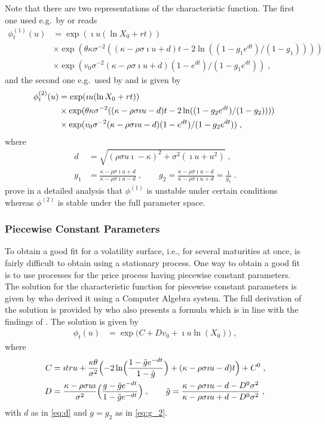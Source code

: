 \documentclass[10pt,a4paper]{article}
\numberwithin{equation}{section} %
\theoremstyle{plain}
\theoremstyle{definition}
\theoremstyle{remark}
\begin{document}
Note that there are two representations of the characteristic function. The first one used e.g.\ by \cite{He93} or \cite{KJ05} reads
\begin{align*}
\phi_t^{(1)}(u)&= \exp (\imath u(\ln X_0 + rt))\;  \\ 
&\times \exp (\theta\kappa\sigma^{-2}((\kappa-\rho\sigma \imath u+d)t-2 \ln((1-g_1e^{dt})/(1-g_1))))\;  \\ 
&\times \exp (v_0\sigma^{-2}(\kappa-\rho\sigma\imath u+d)(1-e^{dt})/(1-g_1e^{dt}))\;,  
\end{align*}
and the second one e.g.\ used by \cite {SST04} and \cite{Ga06} is given by
\begin{align}
\phi_t^{(2)}(u)&= \exp (\imath u(\ln X_0 + rt))\; \label{eq:cf} \\
&\times \exp (\theta\kappa\sigma^{-2}((\kappa-\rho\sigma \imath u-d)t-2 \ln((1-g_2e^{dt})/(1-g_2))))\; \notag \\
&\times \exp (v_0\sigma^{-2}(\kappa-\rho\sigma\imath u-d)(1-e^{dt})/(1-g_2e^{dt}))\;, \notag
\end{align}
where
\begin{align}
d&=\sqrt{(\rho\sigma u\imath-\kappa)^{2}+\sigma^{2}(\imath u+u^2)}\;,\label{eq:d}\\
g_1&=\frac{\kappa-\rho\sigma\imath u+d}{\kappa-\rho\sigma\imath u-d}\;,  \qquad
g_2=\frac{\kappa-\rho\sigma\imath u-d}{\kappa-\rho\sigma\imath u+d}=\frac{1}{g_1}\;\label{eq:g_2}.
\end{align}
\cite{AMST07} prove in a detailed analysis that $\phi^{(1)}$ is unstable under certain conditions whereas $\phi^{(2)}$ is stable under the full parameter space.

\subsubsection{Piecewise Constant Parameters}
\label{subsubsec:PiecewiseConstantParameters}

To obtain a good fit for a volatility surface, i.e., for several maturities at once, is fairly difficult to obtain using a stationary process. One way to obtain a good fit is to use processes for the price process having piecewise constant parameters. The solution for the characteristic function for piecewise constant parameters is given by \cite{MN03} who derived it using a Computer Algebra system. The full derivation of the solution is provided by \cite{E07} who also presents a formula which is in line with the findings of \cite{AMST07}. The solution is given by
\begin{align*}
\phi_t(u)&=\exp \bigl(C+Dv_0+\imath u\ln (X_0)\bigr)\;,
\end{align*}
where
\begin{align*}
C&=\imath t  ru +\frac{\kappa\theta}{\sigma^2}\Bigl(-2\ln \Bigl(\frac{1-\tilde{g}e^{-dt}}{1-\tilde{g}}\Bigr)+(\kappa-\rho\sigma\imath u-d) t \Bigr)+C^0\;,\\
D&=\frac{\kappa-\rho\sigma u\imath}{\sigma^2}\Bigl(\frac{g-\tilde{g}e^{-d t }}{1-\tilde{g}e^{-d t }}\Bigr)\;,\qquad
\tilde{g}=\frac{\kappa-\rho\sigma\imath u-d-D^0\sigma^2}{\kappa-\rho\sigma\imath u+d-D^0\sigma^2}\;,
\end{align*}
with $d$ as in \eqref{eq:d} and $g = g_2$ as in \eqref{eq:g_2}.
\end{document}
